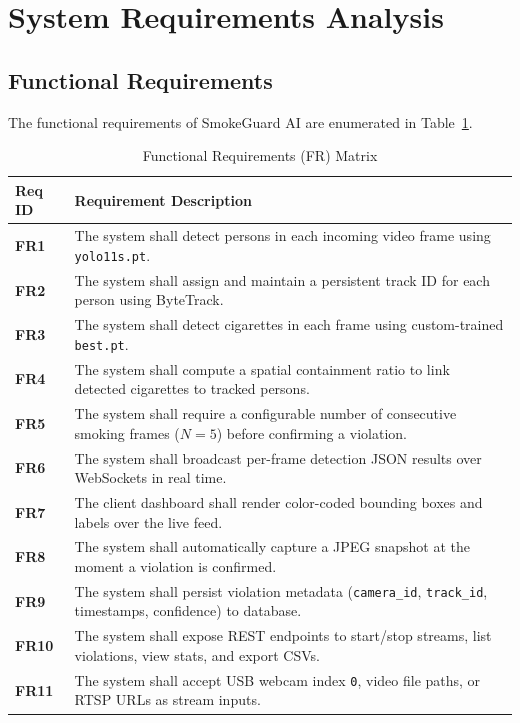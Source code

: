 \documentclass[11pt,a4paper]{article}
\begin{document}
\section{System Requirements Analysis}

\subsection{Functional Requirements}

The functional requirements of SmokeGuard AI are enumerated in Table~\ref{tab:functional_reqs}.

\begin{table}[H]
\centering
\caption{Functional Requirements (FR) Matrix}
\label{tab:functional_reqs}
\small
\vspace{0.4em}
\begin{tabularx}{\textwidth}{l X}
\toprule
\textbf{Req ID} & \textbf{Requirement Description} \\
\midrule
\textbf{FR1} & The system shall detect persons in each incoming video frame using \texttt{yolo11s.pt}. \\
\textbf{FR2} & The system shall assign and maintain a persistent track ID for each person using ByteTrack. \\
\textbf{FR3} & The system shall detect cigarettes in each frame using custom-trained \texttt{best.pt}. \\
\textbf{FR4} & The system shall compute a spatial containment ratio to link detected cigarettes to tracked persons. \\
\textbf{FR5} & The system shall require a configurable number of consecutive smoking frames ($N=5$) before confirming a violation. \\
\textbf{FR6} & The system shall broadcast per-frame detection JSON results over WebSockets in real time. \\
\textbf{FR7} & The client dashboard shall render color-coded bounding boxes and labels over the live feed. \\
\textbf{FR8} & The system shall automatically capture a JPEG snapshot at the moment a violation is confirmed. \\
\textbf{FR9} & The system shall persist violation metadata (\texttt{camera\_id}, \texttt{track\_id}, timestamps, confidence) to database. \\
\textbf{FR10} & The system shall expose REST endpoints to start/stop streams, list violations, view stats, and export CSVs. \\
\textbf{FR11} & The system shall accept USB webcam index \texttt{0}, video file paths, or RTSP URLs as stream inputs. \\
\bottomrule
\end{tabularx}
\end{table}
\end{document}
